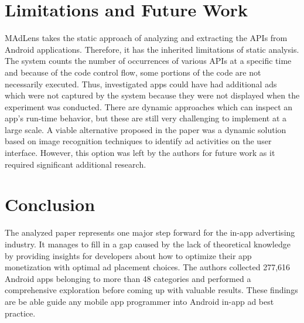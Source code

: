 \documentclass[conference]{IEEEtran}
\begin{document}
\section{Limitations and Future Work}
MAdLens takes the static approach of analyzing and extracting the APIs from Android applications. Therefore, it has the inherited limitations of static analysis. The system counts the number of occurrences of various APIs at a specific time and because of the code control flow, some portions of the code are not necessarily executed. Thus, investigated apps could have had additional ads which were not captured by the system because they were not displayed when the experiment was conducted. There are dynamic approaches which can inspect an app’s run-time behavior, but these are still very challenging to implement at a large scale. A viable alternative proposed in the paper was a dynamic solution based on image recognition techniques to identify ad activities on the user interface. However, this option was left by the authors for future work as it required significant additional research.

\section{Conclusion}
The analyzed paper represents one major step forward for the in-app advertising industry. It manages to fill in a gap caused by the lack of theoretical knowledge by providing insights for developers about how to optimize their app monetization with optimal ad placement choices. The authors collected 277,616 Android apps belonging to more than 48 categories and performed a comprehensive exploration before coming up with valuable results. These findings are be able guide any mobile app programmer into Android in-app ad best practice.





\end{document}
